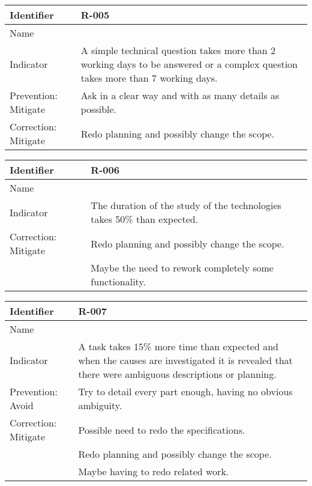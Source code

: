 \begin{table}[H]
	\begin{tabularx}{\textwidth}{|y|z|}
		\hline
		Identifier & \textbf{R-005} \\ \hline
		Name & \Rcinco \\ \hline
		Indicator & A simple technical question takes more than 2 working days to be answered or a complex question takes more than 7 working days.\\ \hline
		Prevention: Mitigate & Ask in a clear way and with as many details as possible.\\ \hline
		Correction: Mitigate
			& Redo planning and possibly change the scope.  \\ \hline
	\end{tabularx}
\end{table}

\begin{table}[H]
	\begin{tabularx}{\textwidth}{|y|z|}
		\hline
		Identifier & \textbf{R-006} \\ \hline
		Name & \Rseis \\ \hline
		Indicator & The duration of the study of the technologies takes 50\% than expected. \\ \hline
		Correction: Mitigate
			& Redo planning and possibly change the scope.  \\
			& Maybe the need to rework completely some functionality. \\ \hline
	\end{tabularx}
\end{table}

\begin{table}[H]
	\begin{tabularx}{\textwidth}{|y|z|}
		\hline
		Identifier & \textbf{R-007} \\ \hline
		Name & \Rsiete \\ \hline
		Indicator & A task takes 15\% more time than expected and when the causes are investigated it is revealed that there were ambiguous descriptions or planning.\\ \hline
		Prevention: Avoid & Try to detail every part enough, having no obvious ambiguity.\\ \hline
		Correction: Mitigate
			& Possible need to redo the specifications.  \\
			& Redo planning and possibly change the scope.  \\
			& Maybe having to redo related work.  \\ \hline
	\end{tabularx}
\end{table}

